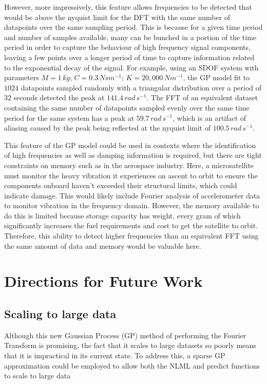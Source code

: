 \documentclass[12pt]{article}
\begin{document}
    However, more impressively, this feature allows frequencies to be detected that would be above the nyquist limit for the DFT with the same number of datapoints over the same sampling period.
    This is because for a given time period and number of samples available, many can be bunched in a portion of the time period in order to capture the behaviour of high frequency signal components, leaving a few points over a longer period of time to capture information related to the exponential decay of the signal.
    For example, using an SDOF system with parameters $M = 1 \, kg$; $C = 0.3 \, Nsm^{-1}$; $K = 20,000 \, Nm^{-1}$, the GP model fit to $1024$ datapoints sampled randomly with a triangular distribution over a period of $32$ seconds detected the peak at $141.4 \, rad \, s^{-1}$.
    The FFT of an equivalent dataset containing the same number of datapoints sampled evenly over the same time period for the same system has a peak at $59.7 \, rad \, s^{-1}$, which is an artifact of aliasing caused by the peak being reflected at the nyquist limit of $100.5 \, rad \, s^{-1}$.

    This feature of the GP model could be used in contexts where the identification of high frequencies as well as damping information is required, but there are tight constraints on memory such as in the aerospace industry.
    Here, a microsatellite must monitor the heavy vibration it experiences on ascent to orbit to ensure the components onboard haven't exceeded their structural limits, which could indicate damage.
    This would likely include Fourier analysis of accelerometer data to monitor vibration in the frequency domain.
    However, the memory available to do this is limited because storage capacity has weight, every gram of which significantly increases the fuel requirements and cost to get the satellite to orbit.
    Therefore, this ability to detect higher frequencies than an equivalent FFT using the same amount of data and memory would be valuable here.

    \section{Directions for Future Work}

    \subsection{Scaling to large data}
    Although this new Gaussian Process (GP) method of performing the Fourier Transform is promising, the fact that it scales to large datasets so poorly means that it is impractical in its current state.
    To address this, a sparse GP approximation could be employed to allow both the NLML and predict functions to scale to large data
\end{document}
